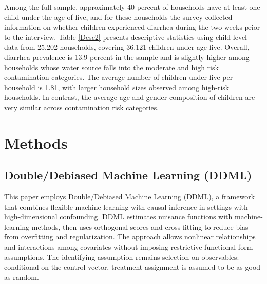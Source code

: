 \documentclass [11pt]{article}
\theoremstyle{plain}
\theoremstyle{definition}
\theoremstyle{remark}
\newcommand{\1}{\bm{1}}
\begin{document}
Among the full sample, approximately 40 percent of households have at least one child under the age of five, and for these households the survey collected information on whether children experienced diarrhea during the two weeks prior to the interview. Table \ref{Desc2} presents descriptive statistics using child-level data from 25,202 households, covering 36,121 children under age five. Overall, diarrhea prevalence is 13.9 percent in the sample and is slightly higher among households whose water source falls into the moderate and high risk contamination categories. The average number of children under five per household is 1.81, with larger household sizes observed among high-risk households. In contrast, the average age and gender composition of children are very similar across contamination risk categories.

{\renewcommand\normalsize{}\normalsize\singlespacing  
}

\section{Methods}

\subsection{Double/Debiased Machine Learning (DDML)}

This paper employs Double/Debiased Machine Learning (DDML), a framework that combines flexible machine learning with causal inference in settings with high-dimensional confounding. DDML estimates nuisance functions with machine-learning methods, then uses orthogonal scores and cross-fitting to reduce bias from overfitting and regularization. The approach allows nonlinear relationships and interactions among covariates without imposing restrictive functional-form assumptions. The identifying assumption remains selection on observables: conditional on the control vector, treatment assignment is assumed to be as good as random.
\end{document}

